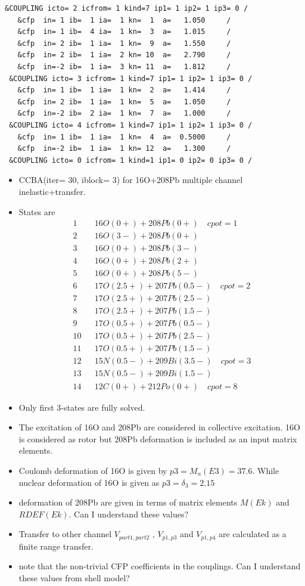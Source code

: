\documentclass[11pt]{book}
\newcommand{\bea}{\begin{eqnarray}}
\newcommand{\eea}{\end{eqnarray}}
\newcommand{\no}{\nonumber \\}
\begin{document}
\begin{small}
\begin{lstlisting}[frame=single]
 &COUPLING icto= 2 icfrom= 1 kind=7 ip1= 1 ip2= 1 ip3= 0 /                      
   &cfp  in= 1 ib=  1 ia=  1 kn=  1  a=   1.050     /                           
   &cfp  in= 1 ib=  4 ia=  1 kn=  3  a=   1.015     /                           
   &cfp  in= 2 ib=  1 ia=  1 kn=  9  a=   1.550     /                           
   &cfp  in= 2 ib=  1 ia=  2 kn= 10  a=   2.790     /                           
   &cfp  in=-2 ib=  1 ia=  3 kn= 11  a=   1.812     /                           
 &COUPLING icto= 3 icfrom= 1 kind=7 ip1= 1 ip2= 1 ip3= 0 /                      
   &cfp  in= 1 ib=  1 ia=  1 kn=  2  a=   1.414     /                           
   &cfp  in= 2 ib=  1 ia=  1 kn=  5  a=   1.050     /                           
   &cfp  in=-2 ib=  2 ia=  1 kn=  7  a=   1.000     /                           
 &COUPLING icto= 4 icfrom= 1 kind=7 ip1= 1 ip2= 1 ip3= 0 /                      
   &cfp  in= 1 ib=  1 ia=  1 kn=  4  a=  0.5000     /                           
   &cfp  in=-2 ib=  1 ia=  1 kn= 12  a=   1.300     /                           
 &COUPLING icto= 0 icfrom= 1 kind=1 ip1= 0 ip2= 0 ip3= 0 /                      
\end{lstlisting}\end{small}
\begin{itemize}
\item CCBA(iter= 30, iblock= 3) for 16O+208Pb multiple channel
      inelastic+transfer.
\item States are
  \bea
  1 & &16O(0+) +208Pb(0+)    \quad cpot=1    \no 
  2 & &16O(3-) +208Pb(0+)              \no 
  3 & &16O(0+) +208Pb(3-)     \no 
  4 & &16O(0+) +208Pb(2+)    \no
  5 & &16O(0+) +208Pb(5-)    \no
  6 & &17O(2.5+) +207Pb(0.5-) \quad cpot=2\no
  7 & &17O(2.5+) +207Pb(2.5-) \no
  8 & &17O(2.5+) +207Pb(1.5-) \no
  9 & &17O(0.5+) +207Pb(0.5-) \no
  10& &17O(0.5+) +207Pb(2.5-) \no
  11& &17O(0.5+) +207Pb(1.5-) \no
  12& &15N(0.5-) +209Bi(3.5-) \quad cpot=3 \no
  13& &15N(0.5-) +209Bi(1.5-) \no
  14& &12C(0+)   +212Po(0+)   \quad cpot=8 
  \eea       
\item Only first 3-states are fully solved.
\item The excitation of 16O and 208Pb are considered in
      collective excitation. 16O is considered as rotor
      but 208Pb deformation is included as an input matrix elements.
\item Coulomb deformation of 16O is given by 
     $p3=M_n(E3)=37.6$. While nuclear deformation of 16O
     is given as $p3=\delta_3=2.15$
           
\item deformation of 208Pb are given in terms of matrix elements
      $M(Ek)$ and $RDEF(Ek)$.
      {\color{blue} Can I understand these values?}
\item Transfer to other channel $V_{part1,part2}$
     , $V_{p1,p3}$ and $V_{p1,p4}$
     are calculated as a finite range transfer.
\item note that the non-trivial CFP coefficients 
      in the couplings. 
      {\color{blue} Can I understand these values from shell model?}                    
\end{itemize}
\end{document}
